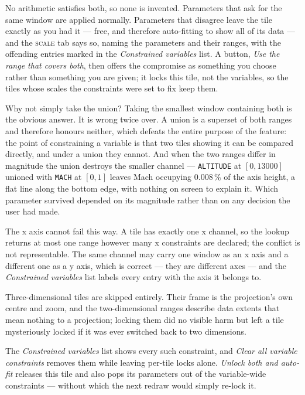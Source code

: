 \documentclass[11pt,a4paper,oneside]{report}
\newcommand{\code}[1]{\texttt{#1}}
\newcommand{\tab}[1]{\textsc{#1}}
\begin{document}
No arithmetic satisfies both, so none is invented. Parameters that ask for the
same window are applied normally. Parameters that disagree leave the tile exactly
as you had it --- free, and therefore auto-fitting to show all of its data ---
and the \tab{scale} tab says so, naming the parameters and their ranges, with the
offending entries marked in the \emph{Constrained variables} list. A button,
\emph{Use the range that covers both}, then offers the compromise as something
you choose rather than something you are given; it locks this tile, not the
variables, so the tiles whose scales the constraints were set to fix keep them.

\begin{aoenote}{Why not simply take the union?}
Taking the smallest window containing both is the obvious answer. It is wrong
twice over. A union is a superset of both
ranges and therefore honours neither, which defeats the entire purpose of the
feature: the point of constraining a variable is that two tiles showing it can be
compared directly, and under a union they cannot. And when the two ranges differ
in magnitude the union destroys the smaller channel --- \code{ALTITUDE} at
$[0, 13000]$ unioned with \code{MACH} at $[0, 1]$ leaves Mach occupying
0.008\,\% of the axis height, a flat line along the bottom edge, with nothing on
screen to explain it. Which parameter survived depended on its magnitude rather
than on any decision the user had made.
\end{aoenote}

The x axis cannot fail this way. A tile has exactly one x channel, so the lookup
returns at most one range however many x constraints are declared; the conflict
is not representable. The same channel may carry one window as an x axis and a
different one as a y axis, which is correct --- they are different axes --- and
the \emph{Constrained variables} list labels every entry with the axis it belongs
to.

Three-dimensional tiles are skipped entirely. Their frame is the projection's own
centre and zoom, and the two-dimensional ranges describe data extents that mean
nothing to a projection; locking them did no visible harm but left a tile
mysteriously locked if it was ever switched back to two dimensions.

The \emph{Constrained variables} list shows every such constraint, and \emph{Clear
all variable constraints} removes them while leaving per-tile locks alone.
\emph{Unlock both and auto-fit} releases this tile and also pops its parameters
out of the variable-wide constraints --- without which the next redraw would
simply re-lock it.
\end{document}
